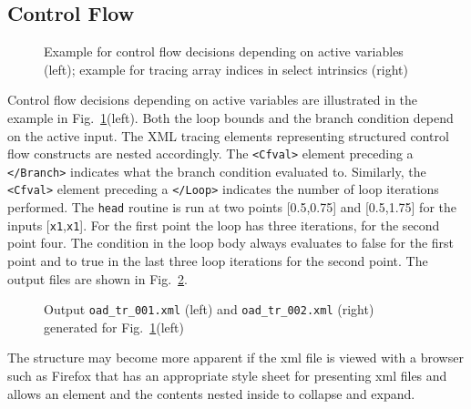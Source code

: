 \documentclass{article}
\newcommand{\reffig}[1]{{Fig.~\ref{#1}}}
\begin{document}
\subsection{Control Flow}
\begin{figure}
\begin{minipage}{.48\linewidth}

\end{minipage}
\begin{minipage}{.48\linewidth}

\end{minipage}
\caption{Example for control flow decisions depending on active variables (left); example for tracing array indices in select intrinsics (right)}\label{fig:ControlFlowArrayIndex} 
\end{figure} 
Control flow decisions depending on active variables are illustrated in the example in 
\reffig{fig:ControlFlowArrayIndex}(left).
Both the loop bounds and the branch condition 
depend on the active input.  
The XML tracing elements representing structured control flow constructs are nested accordingly. 
The \lstinline{<Cfval>} element preceding a \lstinline{</Branch>} indicates what the branch 
condition evaluated to. Similarly, the \lstinline{<Cfval>} element preceding a \lstinline{</Loop>} 
indicates the number of loop iterations performed.       
The \lstinline{head} routine 
is run at two  points [0.5,0.75] and [0.5,1.75] for 
the inputs [\lstinline{x1},\lstinline{x1}].
For the first point 
the loop has three iterations, for the second point four. The condition in the 
loop body always evaluates to false for the first point and to true in the last three loop iterations for the second point. The output files are shown in \reffig{fig:ControlFlowOutput}. 
\begin{figure}
\begin{minipage}[t]{.48\textwidth}

\end{minipage}
\begin{minipage}[t]{.48\textwidth}

\end{minipage}
\caption{Output \lstinline{oad_tr_001.xml} (left) 
and \lstinline{oad_tr_002.xml} (right) 
generated for \reffig{fig:ControlFlowArrayIndex}(left)}\label{fig:ControlFlowOutput}
\end{figure}
The structure may become more apparent if the xml file is viewed  
with a browser such as Firefox that has an appropriate style sheet for presenting xml files 
and allows an element and the contents nested inside to collapse and expand. 
\end{document}
